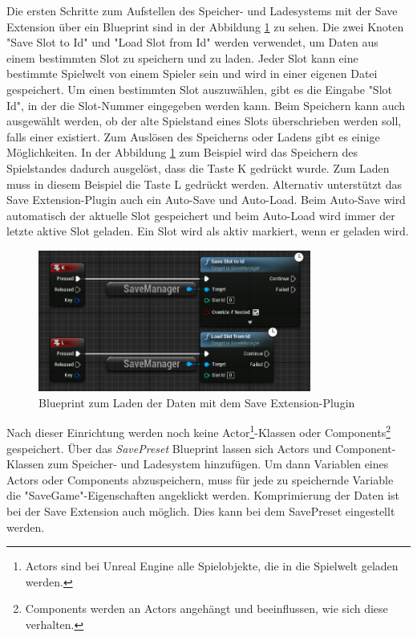 Die ersten Schritte zum Aufstellen des Speicher- und Ladesystems mit der Save Extension über ein Blueprint sind in der Abbildung \ref{fig:unrealSaveExtensionBlueprint} zu sehen. Die zwei Knoten "Save Slot to Id" und "Load Slot from Id" werden verwendet, um Daten aus einem bestimmten Slot zu speichern und zu laden. Jeder Slot kann eine bestimmte Spielwelt von einem Spieler sein und wird in einer eigenen Datei gespeichert.\cite{piperiftPiperiftSaveSlot} Um einen bestimmten Slot auszuwählen, gibt es die Eingabe "Slot Id", in der die Slot-Nummer eingegeben werden kann. Beim Speichern kann auch ausgewählt werden, ob der alte Spielstand eines Slots überschrieben werden soll, falls einer existiert. Zum Auslösen des Speicherns oder Ladens gibt es einige Möglichkeiten. In der Abbildung \ref{fig:unrealSaveExtensionBlueprint} zum Beispiel wird das Speichern des Spielstandes dadurch ausgelöst, dass die Taste K gedrückt wurde. Zum Laden muss in diesem Beispiel die Taste L gedrückt werden. Alternativ unterstützt das Save Extension-Plugin auch ein Auto-Save und Auto-Load. Beim Auto-Save wird automatisch der aktuelle Slot gespeichert und beim Auto-Load wird immer der letzte aktive Slot geladen. Ein Slot wird als aktiv markiert, wenn er geladen wird.\cite{piperiftPiperiftSaveSlot}\cite{piperiftPiperiftSaveBlueprint} 

\begin{figure}[htp]
    \centering
    \includegraphics[width=0.8\textwidth]{images/SaveExtension_load_save_blueprint.png}
    \caption{Blueprint zum Laden der Daten mit dem Save Extension-Plugin \cite{piperiftPiperiftSaveBlueprint}}
    \label{fig:unrealSaveExtensionBlueprint}
\end{figure}

Nach dieser Einrichtung werden noch keine Actor\footnote{Actors sind bei Unreal Engine alle Spielobjekte, die in die Spielwelt geladen werden.\cite{unrealengineActors}}-Klassen oder Components\footnote{Components werden an Actors angehängt und beeinflussen, wie sich diese verhalten.\cite{unrealengineActors}} gespeichert. Über das \textit{SavePreset} Blueprint lassen sich Actors und Component-Klassen zum Speicher- und Ladesystem hinzufügen. Um dann Variablen eines Actors oder Components abzuspeichern, muss für jede zu speichernde Variable die "SaveGame"-Eigenschaften angeklickt werden. Komprimierung der Daten ist bei der Save Extension auch möglich. Dies kann bei dem SavePreset eingestellt werden.


